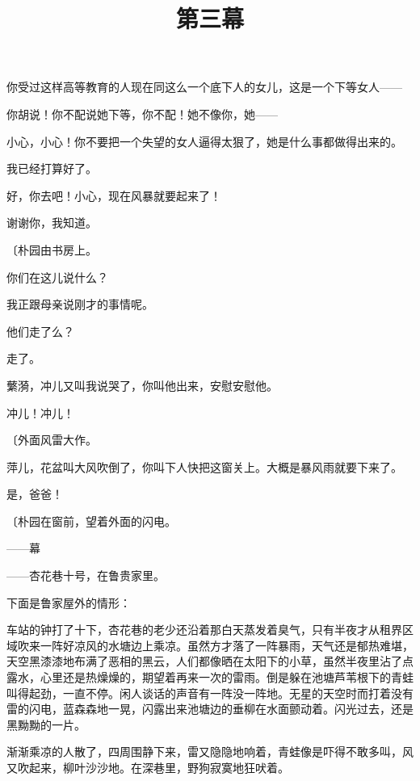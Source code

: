 你受过这样高等教育的人现在同这么一个底下人的女儿，这是一个下等女人——

你胡说！你不配说她下等，你不配！她不像你，她——

小心，小心！你不要把一个失望的女人逼得太狠了，她是什么事都做得出来的。

我已经打算好了。

好，你去吧！小心，现在风暴就要起来了！

谢谢你，我知道。

{\fangsong〔朴园由书房上。}

你们在这儿说什么？

我正跟母亲说刚才的事情呢。

他们走了么？

走了。

蘩漪，冲儿又叫我说哭了，你叫他出来，安慰安慰他。

冲儿！冲儿！

{\fangsong〔外面风雷大作。}

萍儿，花盆叫大风吹倒了，你叫下人快把这窗关上。大概是暴风雨就要下来了。

是，爸爸！

{\fangsong〔朴园在窗前，望着外面的闪电。}

\centerline{——幕}

\title{第三幕}

——杏花巷十号，在鲁贵家里。

下面是鲁家屋外的情形：

车站的钟打了十下，杏花巷的老少还沿着那白天蒸发着臭气，只有半夜才从租界区域吹来一阵好凉风的水塘边上乘凉。虽然方才落了一阵暴雨，天气还是郁热难堪，天空黑漆漆地布满了恶相的黑云，人们都像晒在太阳下的小草，虽然半夜里沾了点露水，心里还是热燥燥的，期望着再来一次的雷雨。倒是躲在池塘芦苇根下的青蛙叫得起劲，一直不停。闲人谈话的声音有一阵没一阵地。无星的天空时而打着没有雷的闪电，蓝森森地一晃，闪露出来池塘边的垂柳在水面颤动着。闪光过去，还是黑黝黝的一片。

渐渐乘凉的人散了，四周围静下来，雷又隐隐地响着，青蛙像是吓得不敢多叫，风又吹起来，柳叶沙沙地。在深巷里，野狗寂寞地狂吠着。

